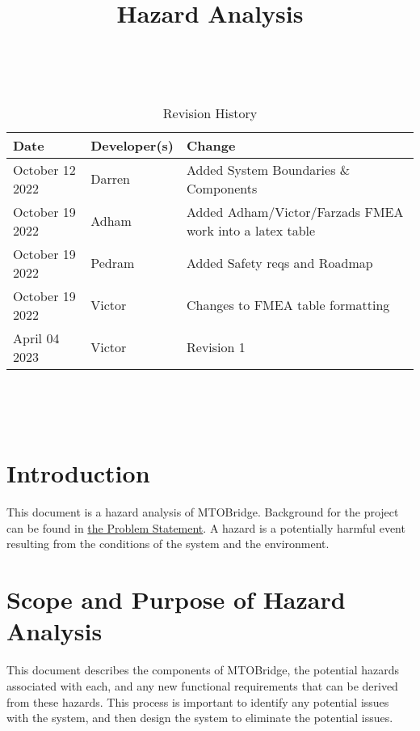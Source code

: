 \documentclass{article}
\title{Hazard Analysis\\\progname}
\author{\authname}
\date{}
\begin{document}
\maketitle
\thispagestyle{empty}

~\newpage


\begin{table}[hp]
\caption{Revision History} \label{TblRevisionHistory}
\begin{tabularx}{\textwidth}{llX}
\toprule
\textbf{Date} & \textbf{Developer(s)} & \textbf{Change}\\
\midrule
October 12 2022 & Darren & Added System Boundaries \& Components\\
October 19 2022& Adham & Added Adham/Victor/Farzads FMEA work into a latex table\\
October 19 2022& Pedram & Added Safety reqs and Roadmap\\
October 19 2022& Victor & Changes to FMEA table formatting\\
April 04 2023& Victor & Revision 1\\


\bottomrule
\end{tabularx}
\end{table}

~\newpage

\tableofcontents

\listoftables

~\newpage




\section{Introduction}

This document is a hazard analysis of MTOBridge. Background for the project can be found in \href{https://github.com/agentvv/MTOBridge/blob/main/docs%20Rev1/ProblemStatementAndGoals/ProblemStatement.pdf}{the Problem Statement}. A hazard is a potentially harmful event resulting
from the conditions of the system and the environment.

\section{Scope and Purpose of Hazard Analysis}

This document describes the components of MTOBridge, the potential hazards associated with each, and 
any new functional requirements that can be derived from these hazards. This process is important to 
identify any potential issues with the system, and then design the system to eliminate the potential issues.
\end{document}
